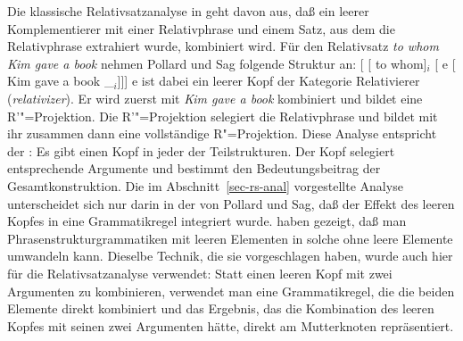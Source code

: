 Die klassische Relativsatzanalyse in  geht davon aus, daß ein leerer
Komplementierer mit einer Relativphrase und einem Satz, aus dem die Relativphrase extrahiert wurde,
kombiniert wird. Für den Relativsatz \emph{to whom Kim gave a book} nehmen Pollard und Sag folgende Struktur an:
\ea
{}[ [ to whom]$_i$ [ e [ Kim gave a book \_$_i$]]]
\z
e ist dabei ein leerer Kopf der Kategorie Relativierer (\emph{relativizer}). Er wird zuerst mit
\emph{Kim gave a book} kombiniert und bildet eine R'"=Projektion. Die R'"=Projektion selegiert die
Relativphrase und bildet mit ihr zusammen dann eine vollständige R"=Projektion. Diese Analyse
entspricht der \xbart: Es gibt einen Kopf in jeder 
der Teilstrukturen. Der Kopf selegiert entsprechende Argumente und bestimmt den Bedeutungsbeitrag
der Gesamtkonstruktion. Die im Abschnitt~\ref{sec-rs-anal} vorgestellte Analyse unterscheidet sich
nur darin in der von Pollard und Sag, daß der Effekt des leeren Kopfes in eine Grammatikregel
integriert wurde. \citet*[, Lemma~4.1]{BHPS61a} haben gezeigt, daß man
Phrasenstrukturgrammatiken mit leeren Elementen in solche ohne leere Elemente umwandeln
kann. Dieselbe Technik, die sie vorgeschlagen haben, wurde auch hier für die Relativsatzanalyse
verwendet: Statt einen leeren Kopf mit zwei Argumenten zu kombinieren, verwendet man eine
Grammatikregel, die die beiden Elemente direkt kombiniert und das Ergebnis, das die Kombination des
leeren Kopfes mit seinen zwei Argumenten hätte, direkt am Mutterknoten repräsentiert.

